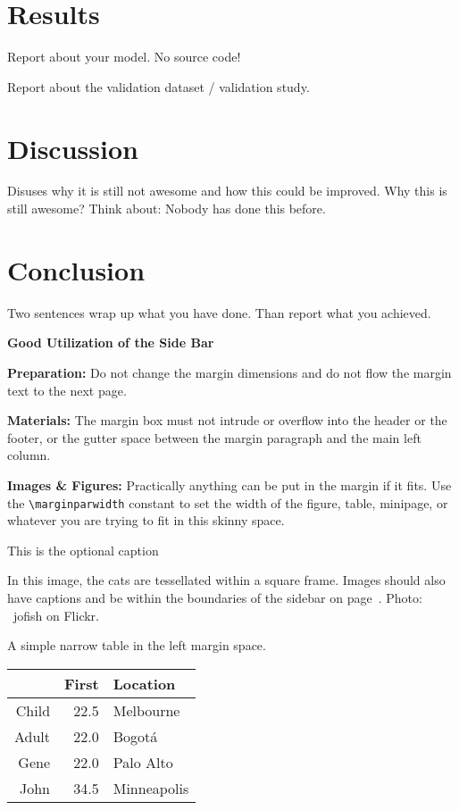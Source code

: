 \documentclass[sigchi-a, authorversion]{acmart}
\begin{document}
\section{Results}
Report about your model. No source code!

Report about the validation dataset / validation study. 
\section{Discussion}
Disuses why it is still not awesome and how this could be improved. Why this is still awesome? Think about: Nobody has done this before. 
\section{Conclusion}
Two sentences wrap up what you have done. Than report what you achieved. 


\begin{sidebar}
  \textbf{Good Utilization of the Side Bar}

  \textbf{Preparation:} Do not change the margin
  dimensions and do not flow the margin text to the
  next page.

  \textbf{Materials:} The margin box must not intrude
  or overflow into the header or the footer, or the gutter space
  between the margin paragraph and the main left column.

  \textbf{Images \& Figures:} Practically anything
  can be put in the margin if it fits. Use the
  \texttt{{\textbackslash}marginparwidth} constant to set the
  width of the figure, table, minipage, or whatever you are trying
  to fit in this skinny space.

  \caption{This is the optional caption}
  \label{bar:sidebar}
\end{sidebar}



\begin{marginfigure}
    \caption{In this image, the cats are tessellated within a square
      frame. Images should also have captions and be within the
      boundaries of the sidebar on page~\pageref{bar:sidebar}. Photo:
      \cczero~jofish on Flickr.}
    \label{fig:marginfig}
\end{marginfigure}

\begin{margintable}
    \caption{A simple narrow table in the left margin
      space.}
    \label{tab:table2}
    \begin{tabular}{r r l}
      & {\small \textbf{First}}
      & {\small \textbf{Location}} \\
      \toprule
      Child & 22.5 & Melbourne \\
      Adult & 22.0 & Bogot\'a \\
      \midrule
      Gene & 22.0 & Palo Alto \\
      John & 34.5 & Minneapolis \\
      \bottomrule
    \end{tabular}
\end{margintable}



\end{document}
